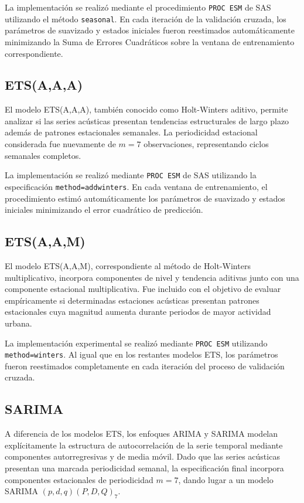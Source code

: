 La implementación se realizó mediante el procedimiento \texttt{PROC ESM} de SAS utilizando el método \texttt{seasonal}. En cada iteración de la validación cruzada, los parámetros de suavizado y estados iniciales fueron reestimados automáticamente minimizando la Suma de Errores Cuadráticos sobre la ventana de entrenamiento correspondiente.

\subsection{ETS(A,A,A)}
\label{cap5:modelos:aaa}

El modelo ETS(A,A,A), también conocido como Holt-Winters aditivo, permite analizar si las series acústicas presentan tendencias estructurales de largo plazo además de patrones estacionales semanales. La periodicidad estacional considerada fue nuevamente de $m=7$ observaciones, representando ciclos semanales completos.

La implementación se realizó mediante \texttt{PROC ESM} de SAS utilizando la especificación \texttt{method=addwinters}. En cada ventana de entrenamiento, el procedimiento estimó automáticamente los parámetros de suavizado y estados iniciales minimizando el error cuadrático de predicción.

\subsection{ETS(A,A,M)}
\label{cap5:modelos:aam}

El modelo ETS(A,A,M), correspondiente al método de Holt-Winters multiplicativo, incorpora componentes de nivel y tendencia aditivas junto con una componente estacional multiplicativa. Fue incluido con el objetivo de evaluar empíricamente si determinadas estaciones acústicas presentan patrones estacionales cuya magnitud aumenta durante periodos de mayor actividad urbana.

La implementación experimental se realizó mediante \texttt{PROC ESM} utilizando \texttt{method=winters}. Al igual que en los restantes modelos ETS, los parámetros fueron reestimados completamente en cada iteración del proceso de validación cruzada.

\subsection{SARIMA}
\label{cap5:modelos:arima}

A diferencia de los modelos ETS, los enfoques ARIMA y SARIMA modelan explícitamente la estructura de autocorrelación de la serie temporal mediante componentes autorregresivas y de media móvil. Dado que las series acústicas presentan una marcada periodicidad semanal, la especificación final incorpora componentes estacionales de periodicidad $m=7$, dando lugar a un modelo SARIMA $(p,d,q)(P,D,Q)_7$.

